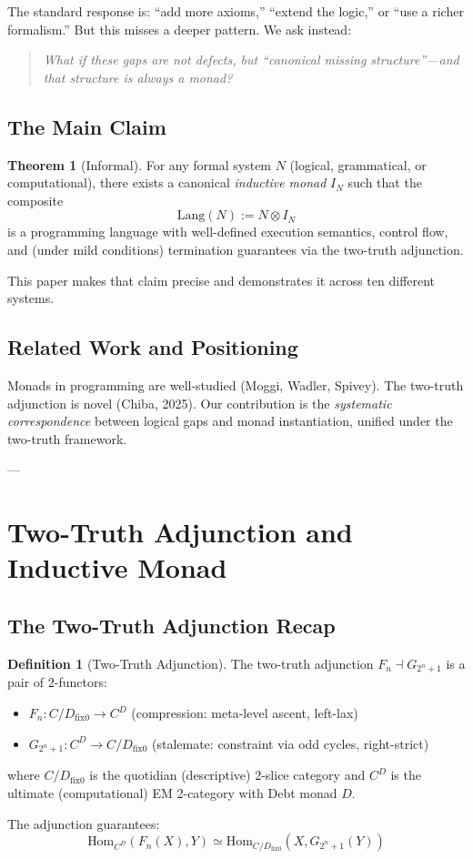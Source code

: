 \documentclass[a4paper,11pt]{article}
\theoremstyle{definition}
\newtheorem{definition}{Definition}[section]
\newtheorem{theorem}{Theorem}[section]
\begin{document}
The standard response is: ``add more axioms,'' ``extend the logic,'' or ``use a richer formalism.'' But this misses a deeper pattern. We ask instead:

\begin{quote}
\emph{What if these gaps are not defects, but ``canonical missing structure''—and that structure is always a monad?}
\end{quote}

\subsection{The Main Claim}

\begin{theorem}[Informal]
For any formal system $N$ (logical, grammatical, or computational), there exists a canonical \emph{inductive monad} $I_N$ such that the composite
\[
  \text{Lang}(N) := N \otimes I_N
\]
is a programming language with well-defined execution semantics, control flow, and (under mild conditions) termination guarantees via the two-truth adjunction.
\end{theorem}

This paper makes that claim precise and demonstrates it across ten different systems.

\subsection{Related Work and Positioning}

Monads in programming are well-studied (Moggi, Wadler, Spivey). The two-truth adjunction is novel (Chiba, 2025). Our contribution is the \emph{systematic correspondence} between logical gaps and monad instantiation, unified under the two-truth framework.

---

\section{Two-Truth Adjunction and Inductive Monad}

\subsection{The Two-Truth Adjunction Recap}

\begin{definition}[Two-Truth Adjunction]
The two-truth adjunction $F_n \dashv G_{2^n+1}$ is a pair of 2-functors:
\begin{itemize}
  \item $F_n : C/D_{\mathrm{fix}0} \to C^D$ (compression: meta-level ascent, left-lax)
  \item $G_{2^n+1} : C^D \to C/D_{\mathrm{fix}0}$ (stalemate: constraint via odd cycles, right-strict)
\end{itemize}
where $C/D_{\mathrm{fix}0}$ is the quotidian (descriptive) 2-slice category and $C^D$ is the ultimate (computational) EM 2-category with Debt monad $D$.

The adjunction guarantees:
\[
  \text{Hom}_{C^D}(F_n(X), Y) \simeq \text{Hom}_{C/D_{\text{fix}0}}(X, G_{2^n+1}(Y))
\]
\end{definition}
\end{document}
